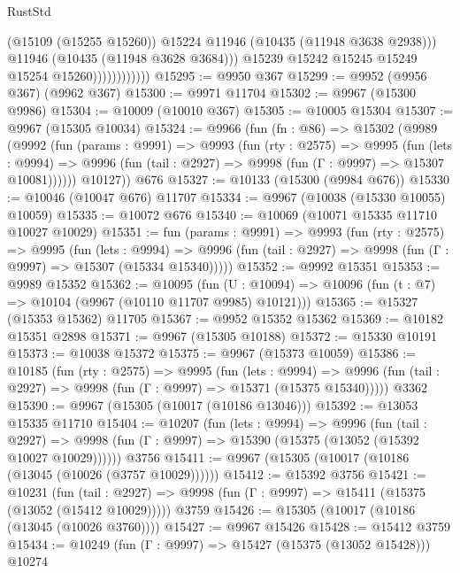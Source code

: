 \begin{lexlean}{RustStd}
\begin{coremodule}
{\begin{coremodule}
{{{{{{{{{{{{{{{{{{{{{{{{{{{{{{{{{{{{{{{{{{{{{{{{{{{{{{{{{{{{{{{{{{{{{{{{{{{{{{                                (@15109 (@15255 @15260))
                                @15224
                                @11946
                                (@10435 (@11948 @3638 @2938)))
                              @11946
                              (@10435 (@11948 @3628 @3684)))
                            @15239
                            @15242
                            @15245
                            @15249
                            @15254
                            @15260))))))))))))
@15295 := @9950 @367
@15299 := @9952 (@9956 @367) (@9962 @367)
@15300 := @9971 @11704
@15302 := @9967 (@15300 @9986)
@15304 := @10009 (@10010 @367)
@15305 := @10005 @15304
@15307 := @9967 (@15305 @10034)
@15324 := @9966
    (fun (fn : @86) =>
    @15302
      (@9989
        (@9992
          (fun (params : @9991) =>
          @9993
            (fun (rty : @2575) =>
            @9995
              (fun (lets : @9994) =>
              @9996 (fun (tail : @2927) => @9998 (fun (Γ : @9997) => @15307 @10081))))))
        @10127))
    @676
@15327 := @10133 (@15300 (@9984 @676))
@15330 := @10046 (@10047 @676) @11707
@15334 := @9967 (@10038 (@15330 @10055) @10059)
@15335 := @10072 @676
@15340 := @10069 (@10071 @15335 @11710 @10027 @10029)
@15351 := fun (params : @9991) =>
  @9993
    (fun (rty : @2575) =>
    @9995
      (fun (lets : @9994) =>
      @9996 (fun (tail : @2927) => @9998 (fun (Γ : @9997) => @15307 (@15334 @15340)))))
@15352 := @9992 @15351
@15353 := @9989 @15352
@15362 := @10095
    (fun (U : @10094) => @10096 (fun (t : @7) => @10104 (@9967 (@10110 @11707 @9985) @10121)))
@15365 := @15327 (@15353 @15362) @11705
@15367 := @9952 @15352 @15362
@15369 := @10182 @15351 @2898
@15371 := @9967 (@15305 @10188)
@15372 := @15330 @10191
@15373 := @10038 @15372
@15375 := @9967 (@15373 @10059)
@15386 := @10185
    (fun (rty : @2575) =>
    @9995
      (fun (lets : @9994) =>
      @9996 (fun (tail : @2927) => @9998 (fun (Γ : @9997) => @15371 (@15375 @15340)))))
    @3362
@15390 := @9967 (@15305 (@10017 (@10186 @13046)))
@15392 := @13053 @15335 @11710
@15404 := @10207
    (fun (lets : @9994) =>
    @9996
      (fun (tail : @2927) =>
      @9998 (fun (Γ : @9997) => @15390 (@15375 (@13052 (@15392 @10027 @10029))))))
    @3756
@15411 := @9967 (@15305 (@10017 (@10186 (@13045 (@10026 (@3757 @10029))))))
@15412 := @15392 @3756
@15421 := @10231
    (fun (tail : @2927) => @9998 (fun (Γ : @9997) => @15411 (@15375 (@13052 (@15412 @10029)))))
    @3759
@15426 := @15305 (@10017 (@10186 (@13045 (@10026 @3760))))
@15427 := @9967 @15426
@15428 := @15412 @3759
@15434 := @10249 (fun (Γ : @9997) => @15427 (@15375 (@13052 @15428))) @10274
}}}}}}}}}}}}}}}}}}}}}}}}}}}}}}}}}}}}}}}}}}}}}}}}}}}}}}}}}}}}}}}}}}}}}}}}}}}}}}
\end{coremodule}}
\end{coremodule}
\end{lexlean}
